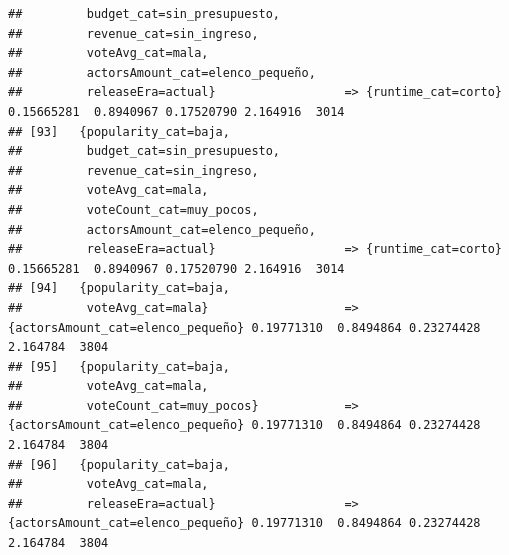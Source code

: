 \documentclass[
]{article}
\begin{document}
\begin{verbatim}
##         budget_cat=sin_presupuesto,                                                                                             
##         revenue_cat=sin_ingreso,                                                                                                
##         voteAvg_cat=mala,                                                                                                       
##         actorsAmount_cat=elenco_pequeño,                                                                                        
##         releaseEra=actual}                  => {runtime_cat=corto}               0.15665281  0.8940967 0.17520790 2.164916  3014
## [93]   {popularity_cat=baja,                                                                                                    
##         budget_cat=sin_presupuesto,                                                                                             
##         revenue_cat=sin_ingreso,                                                                                                
##         voteAvg_cat=mala,                                                                                                       
##         voteCount_cat=muy_pocos,                                                                                                
##         actorsAmount_cat=elenco_pequeño,                                                                                        
##         releaseEra=actual}                  => {runtime_cat=corto}               0.15665281  0.8940967 0.17520790 2.164916  3014
## [94]   {popularity_cat=baja,                                                                                                    
##         voteAvg_cat=mala}                   => {actorsAmount_cat=elenco_pequeño} 0.19771310  0.8494864 0.23274428 2.164784  3804
## [95]   {popularity_cat=baja,                                                                                                    
##         voteAvg_cat=mala,                                                                                                       
##         voteCount_cat=muy_pocos}            => {actorsAmount_cat=elenco_pequeño} 0.19771310  0.8494864 0.23274428 2.164784  3804
## [96]   {popularity_cat=baja,                                                                                                    
##         voteAvg_cat=mala,                                                                                                       
##         releaseEra=actual}                  => {actorsAmount_cat=elenco_pequeño} 0.19771310  0.8494864 0.23274428 2.164784  3804

\end{verbatim}
\end{document}
